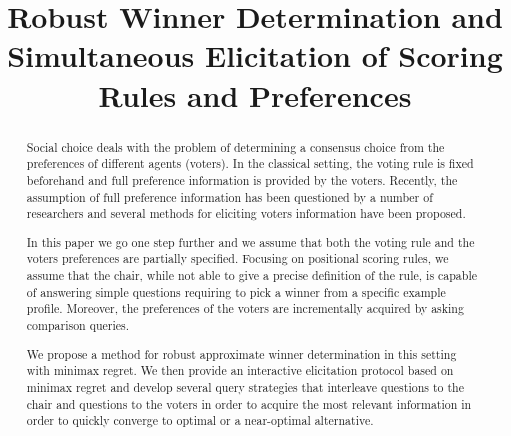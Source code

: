 \newcommand{\profile}{\bm{v}}%
\newcommand{\pprofile}{{\bm{p}}}%
\newcommand{\w}{\bm{w}}
\newcommand{\pw}{W}%
\newcommand{\C}{\mathcal{C}}%
\newcommand{\powersetz}[1]{\mathscr{P}^*(#1)}

\DeclareMathOperator{\Regret}{Regret}
\DeclareMathOperator{\SCORE}{Score}
\DeclareMathOperator{\PMR}{PMR}
\DeclareMathOperator{\MR}{MR}
\DeclareMathOperator{\MMR}{MMR}

\newtheorem{claim}{Claim}
\newtheorem{prop}{Proposition}
\newtheorem{corollary}{Corollary}
\newtheorem{definition}{Definition}
\newtheorem{example}{Example}

\DeclarePairedDelimiter\set{\{}{\}}

\title{Robust Winner Determination and Simultaneous Elicitation of Scoring Rules and Preferences}


\maketitle
\begin{abstract}
Social choice deals with the problem of determining a consensus choice from the preferences of different agents (voters).
In the classical setting, the voting rule is fixed beforehand and full preference information is provided by the voters. 
Recently, the assumption of full preference information has been questioned by a number of researchers and several methods for eliciting voters information have been proposed.

In this paper we go one step further and we assume that both the voting rule and the voters preferences are partially specified.
Focusing on positional scoring rules, we assume that the chair, while  not able to give a precise definition of the rule, is capable of answering simple questions  requiring to pick a winner from a specific  example profile.
Moreover, the preferences of the voters are incrementally acquired by asking comparison queries.

We propose a method  for robust approximate winner determination in this setting with minimax regret. 
We then provide an interactive elicitation protocol based on minimax regret
and develop several query strategies that interleave questions to the chair and questions to the voters in order to acquire the most relevant information in order to quickly converge to optimal or a near-optimal alternative.
\end{abstract}

